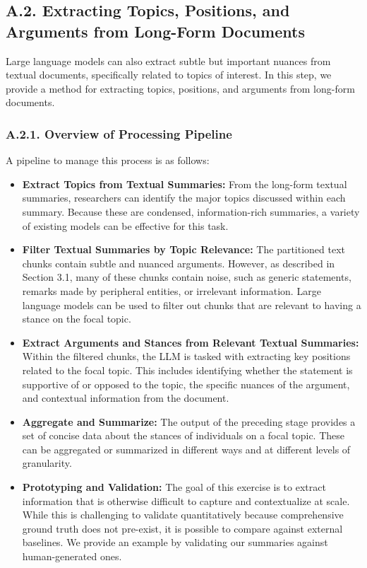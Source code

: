 \documentclass[11pt]{article}
\begin{document}
\subsection*{A.2. Extracting Topics, Positions, and Arguments from Long-Form Documents}

Large language models can also extract subtle but important nuances from textual documents, specifically related to topics of interest. In this step, we provide a method for extracting topics, positions, and arguments from long-form documents.

\subsubsection*{A.2.1. Overview of Processing Pipeline}

A pipeline to manage this process is as follows:

\begin{itemize}
    \item \textbf{Extract Topics from Textual Summaries:} From the long-form textual summaries, researchers can identify the major topics discussed within each summary. Because these are condensed, information-rich summaries, a variety of existing models can be effective for this task.
    \item \textbf{Filter Textual Summaries by Topic Relevance:} The partitioned text chunks contain subtle and nuanced arguments. However, as described in Section 3.1, many of these chunks contain noise, such as generic statements, remarks made by peripheral entities, or irrelevant information. Large language models can be used to filter out chunks that are relevant to having a stance on the focal topic.
    \item \textbf{Extract Arguments and Stances from Relevant Textual Summaries:} Within the filtered chunks, the LLM is tasked with extracting key positions related to the focal topic. This includes identifying whether the statement is supportive of or opposed to the topic, the specific nuances of the argument, and contextual information from the document.
    \item \textbf{Aggregate and Summarize:} The output of the preceding stage provides a set of concise data about the stances of individuals on a focal topic. These can be aggregated or summarized in different ways and at different levels of granularity.
    \item \textbf{Prototyping and Validation:} The goal of this exercise is to extract information that is otherwise difficult to capture and contextualize at scale. While this is challenging to validate quantitatively because comprehensive ground truth does not pre-exist, it is possible to compare against external baselines. We provide an example by validating our summaries against human-generated ones.
\end{itemize}
\end{document}
